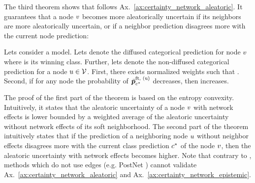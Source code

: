 The third theorem shows that \GPNacro{} follows Ax.~\ref{ax:certainty_network_aleatoric}. It guarantees that a node $v$ becomes more aleatorically uncertain if its neighbors are more aleatorically uncertain, or if a neighbor prediction disagrees more with the current node prediction:
\begin{theorem}
\label{thm:axiom-network-aleatoric}
Lets consider a \GPNacro{} model. Lets denote  the diffused categorical prediction for node $v$ where \smash{$\iclass^*$} is its winning class. Further, lets denote  the non-diffused categorical prediction for a node $\nodeu \in \vertices$. First, there exists normalized weights  such that . Second, if for any node \smash{$\nodeu \in \vertices$} the probability of $\bar{\bm{p}}_{c^*}^\text{ft, (u)}$ decreases, then  increases.
\end{theorem}
The proof of the first part of the theorem is based on the entropy convexity. Intuitively, it states that the aleatoric uncertainty  of a node $v$ with network effects is lower bounded by a weighted average of the aleatoric uncertainty without network effects of its soft neighborhood. The second part of the theorem intuitively states that if the prediction of a neighboring node $u$ without neighbor effects disagrees more with the current class prediction $\iclass^*$ of the node $v$, then the aleatoric uncertainty  with network effects becomes higher. Note that contrary to \GPNacro{}, methods which do not use edges (e.g. PostNet \cite{charpentier2020}) cannot validate Ax.~\ref{ax:certainty_network_aleatoric} and Ax.~\ref{ax:certainty_network_epistemic}.